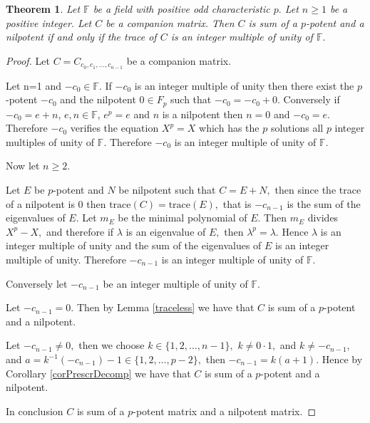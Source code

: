 \documentclass[11pt]{amsart}
\newtheorem{thm}{Theorem}
\theoremstyle{definition}
\numberwithin{equation}{section}
\newcommand{\F}{\mathbb{F}}
\begin{document}
\begin{thm}\label{mainThm}
Let $\F$ be a field with positive odd characteristic $p.$ Let $n\geq 1$ be a positive integer.
Let $C$ be a companion matrix. Then $C$ is sum of a $p$-potent and a nilpotent if and only if the trace of $C$ is an integer multiple of unity of $\F.$
\end{thm}
\begin{proof}
Let $C=C_{c_0,c_1,\ldots,c_{n-1}}$ be a companion matrix.

Let n=1 and $-c_0\in \F$. If $-c_0$ is an integer multiple of unity then there exist the $p$-potent $-c_0$ and the nilpotent $0\in F_p$ such that $-c_0=-c_0+0$. Conversely if $-c_0=e+n$, $e,n\in \F$, $e^p=e$ and $n$ is a nilpotent then $n=0$ and $-c_0=e.$ Therefore $-c_0$ verifies the equation $X^p=X$ which has the $p$ solutions all $p$ integer multiples of unity of $\F.$ Therefore $-c_0$ is an integer multiple of unity of $\F.$

Now let $n\geq 2.$

 Let $E$ be $p$-potent and $N$ be nilpotent such that $C=E+N,$ then since the trace of a nilpotent is $0$ then $\mbox{trace}(C)=\mbox{trace}(E),$ that is $-c_{n-1}$ is the sum of the eigenvalues of $E$. Let $m_E$ be the minimal polynomial of $E$. Then $m_E$ divides $X^p-X,$ and therefore if $\lambda$ is an eigenvalue of $E,$ then $\lambda^p=\lambda.$ Hence $\lambda$ is an integer multiple of unity and the sum of the eigenvalues of $E$ is an integer multiple of unity. Therefore $-c_{n-1}$ is an integer multiple of unity of $\F.$

Conversely let $-c_{n-1}$ be an integer multiple of unity of $\F.$

Let $-c_{n-1}=0$. Then by Lemma \ref{traceless} we have that $C$ is sum of a $p$-potent and a nilpotent.

Let $-c_{n-1}\neq 0,$ then we choose $k\in \{1,2,\ldots,n-1\},$ $k\neq 0\cdot 1,$ and $k\neq -c_{n-1}$, and $a=k^{-1}(-c_{n-1})-1\in \{1,2,\ldots,p-2\},$  then $-c_{n-1}=k(a+1)$. Hence by Corollary \ref{corPrescrDecomp} we have that $C$ is sum of a $p$-potent and a nilpotent.



In conclusion $C$ is sum of a $p$-potent matrix and a nilpotent matrix.
\end{proof}
\end{document}
